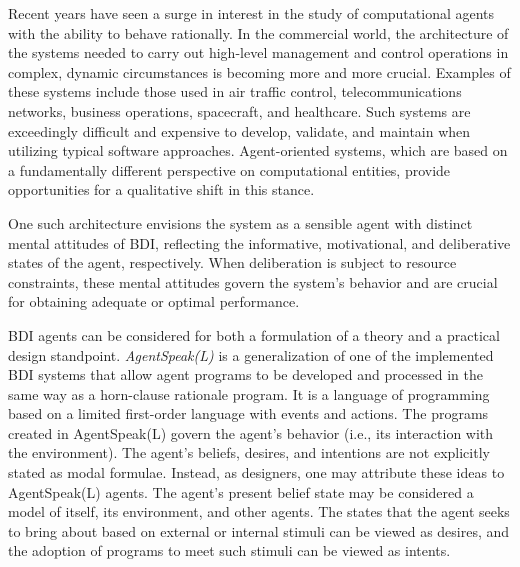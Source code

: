 \vspace{.5cm}

Recent years have seen a surge in interest in the study of computational agents with the ability to behave rationally. In the commercial world, the architecture of the systems needed to carry out high-level management and control operations in complex, dynamic circumstances is becoming more and more crucial. Examples of these systems include those used in air traffic control, telecommunications networks, business operations, spacecraft, and healthcare. Such systems are exceedingly difficult and expensive to develop, validate, and maintain when utilizing typical software approaches. Agent-oriented systems, which are based on a fundamentally different perspective on computational entities, provide opportunities for a qualitative shift in this stance. 

\vspace{.5cm}

One such architecture envisions the system as a sensible agent with distinct mental attitudes of \ac{BDI}, reflecting the informative, motivational, and deliberative states of the agent, respectively. When deliberation is subject to resource constraints, these mental attitudes govern the system's behavior and are crucial for obtaining adequate or optimal performance.

\vspace{.5cm}

\ac{BDI} agents can be considered for both a formulation of a theory and a practical design standpoint. \textit{AgentSpeak(L)} is a generalization of one of the implemented \ac{BDI} systems that allow agent programs to be developed and processed in the same way as a horn-clause rationale program. It is a language of programming based on a limited first-order language with events and actions. The programs created in AgentSpeak(L) govern the agent's behavior (i.e., its interaction with the environment). The agent's beliefs, desires, and intentions are not explicitly stated as modal formulae. Instead, as designers, one may attribute these ideas to AgentSpeak(L) agents. The agent's present belief state may be considered a model of itself, its environment, and other agents. The states that the agent seeks to bring about based on external or internal stimuli can be viewed as desires, and the adoption of programs to meet such stimuli can be viewed as intents.

\vspace{.5cm}

